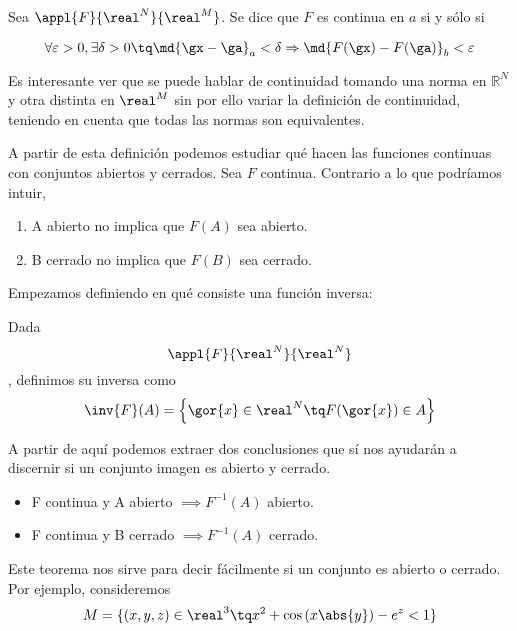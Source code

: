 \documentclass{apuntes}
\begin{document}
\begin{defn} Sea $\appl{F}{\real^N}{\real^M}$. Se dice que $F$ es continua en $a$ si y sólo si 

\[  \forall \varepsilon > 0 , \exists \delta > 0 \tq \md{\gx-\ga}_a < \delta \Rightarrow \md{F(\gx)-F(\ga)}_b< \varepsilon \]
\label{dfnContinua}
\end{defn}

\begin{remark} Es interesante ver que se puede hablar de continuidad tomando una norma en $\mathbb{R}^N$ y otra distinta en $\real^M$ sin por ello variar la definición de continuidad, teniendo en cuenta que todas las normas son equivalentes. \end{remark}

A partir de esta definición podemos estudiar qué hacen las funciones continuas con conjuntos abiertos y cerrados. Sea $F$ continua. Contrario a lo que podríamos intuir, 

\begin{enumerate}
\item A abierto no implica que  $F(A)$ sea abierto.
\item B cerrado no implica que $F(B)$ sea cerrado.
\end{enumerate}

Empezamos definiendo en qué consiste una función inversa:

\begin{defn} Dada \[\appl{F}{\real^N}{\real^N}\], definimos su inversa como
\[ \inv{F}(A) = \left\{\gor{x}\in \real^N \tq F(\gor{x})\in A\right\} \]
\end{defn}

A partir de aquí podemos extraer dos conclusiones que sí nos ayudarán a discernir si un conjunto imagen es abierto y cerrado.

\begin{theorem}\par\noindent\par
\label{thmInversa}
\begin{itemize}
\item F continua y A abierto $\implies F^{-1} (A)$ abierto.
\item F continua y B cerrado $\implies F^{-1} (A)$ cerrado.
\end{itemize}
\end{theorem}

Este teorema nos sirve para decir fácilmente si un conjunto es abierto o cerrado. Por ejemplo, consideremos
 \[ M=\{(x,y,z) \in \real^3 \tq x^2 + \cos\left(x\abs{y}\right) - e^z < 1 \} \]
\end{document}
